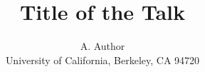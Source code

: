 \documentclass{is2014}
\title{Title of the Talk} %
\author{
  A. Author \\ 
  University of California, Berkeley, CA 94720 \\
  \vspace{-5mm}
}
\date{}
\begin{document}
\linenumbers %

\maketitle %

\thispagestyle{fancy} %


\begin{abstract}

\noindent 
\lipsum[1] %

\end{abstract}

\end{document}
